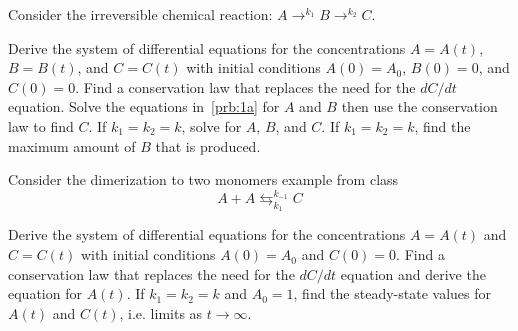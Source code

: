 \documentclass[
	number={7},
]{math486homework}
\begin{document}
\maketitle

\begin{problems}
	\problem Consider the irreversible chemical reaction: $A \rightarrow^{k_{1}} B \rightarrow^{k_{2}} C$.
	\begin{problems}
		\subproblem Derive the system of differential equations for the concentrations $A = A(t)$, $B = B(t)$, and $C = C(t)$ with initial conditions $A(0) = A_{0}$, $B(0) = 0$, and $C(0) = 0$.
		\subproblem Find a conservation law that replaces the need for the $dC/dt$ equation.
		\subproblem Solve the equations in~\ref{prb:1a} for $A$ and $B$ then use the conservation law to find $C$.
		\subproblem If $k_{1} = k_{2} = k$, solve for $A$, $B$, and $C$.
		\subproblem If $k_{1} = k_{2} = k$, find the maximum amount of $B$ that is produced.
	\end{problems}
	\problem Consider the dimerization to two monomers example from class
	\[ A + A \leftrightarrows^{k_{-1}}_{k_{1}} C \]
	\begin{problems}
		\subproblem Derive the system of differential equations for the concentrations $A = A(t)$ and $C = C(t)$ with initial conditions $A(0) = A_{0}$ and $C(0) = 0$.
		\subproblem Find a conservation law that replaces the need for the $dC/dt$ equation and derive the equation for $A(t)$.
		\subproblem If $k_{1} = k_{2} = k$ and $A_{0} = 1$, find the steady-state values for $A(t)$ and $C(t)$, i.e. limits as $t \rightarrow \infty$.
	\end{problems}
	\subproblem
\end{problems}
\end{document}
